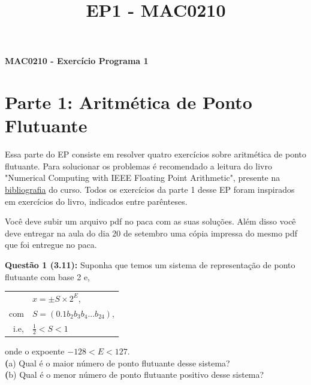 \documentclass[12pt]{article}
\newcommand{\questao}[1] {\vspace{12pt} \noindent \large \textbf{Questão #1:} \normalsize}
\renewcommand{\part}[1] {\noindent\textbf (#1)}
\begin{document}
\title{EP1 - MAC0210}
\begin{flushleft}
    \textbf{\fontsize{20pt}{2em}\selectfont 
        MAC0210 - Exercício Programa 1\\}
    \fontsize{10pt}{1em}
\end{flushleft}


\section {Parte 1: Aritmética de Ponto Flutuante}
    Essa parte do EP consiste em resolver quatro exercícios sobre 
aritmética de ponto flutuante. Para solucionar os problemas é
recomendado a leitura do livro "Numerical Computing with IEEE Floating
Point Arithmetic", presente na 
\href{http://ime.usp.br/~egbirgin/mac210/biblio.html}{bibliografia} do 
curso. Todos os exercícios da parte 1 desse EP foram inspirados em 
exercícios do livro, indicados entre parênteses.

    Você deve subir um arquivo pdf no paca com as suas soluções.
Além disso você deve entregar na aula do dia 20 de setembro uma 
cópia impressa do mesmo pdf que foi entregue no paca.

\questao{1 (3.11)} 
Suponha que temos um sistema de representação de ponto flutuante com
base 2 e,
\begin{center}
    \begin{tabular}{r l}
             & $x = \pm S \times 2^E$,\\ 
        com  & $S = (0.1b_2b_3b_4...b_{24})$, \\
        i.e, & $\frac{1}{2} < S < 1$
    \end{tabular}
\end{center}
onde o expoente $-128 < E < 127$. \\ 
\part{a} Qual é o maior número de ponto flutuante desse sistema? \\
\part{b} Qual é o menor número de ponto flutuante positivo desse 
sistema? \\
\end{document}
